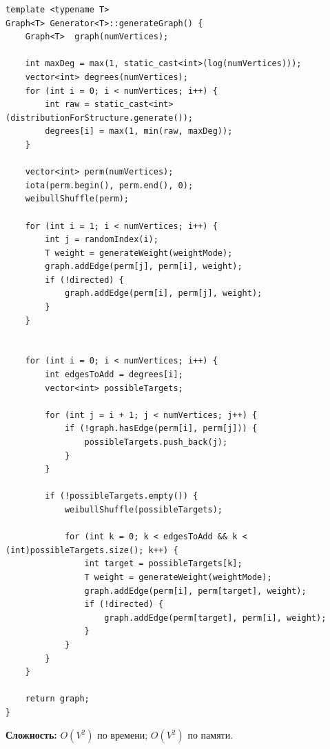 \begin{lstlisting}[style=cstyle, caption={Генерация графа (generator.cpp)}]
template <typename T>
Graph<T> Generator<T>::generateGraph() {
	Graph<T>  graph(numVertices);

	int maxDeg = max(1, static_cast<int>(log(numVertices)));
	vector<int> degrees(numVertices);
	for (int i = 0; i < numVertices; i++) {
		int raw = static_cast<int>(distributionForStructure.generate());
		degrees[i] = max(1, min(raw, maxDeg));
	}

	vector<int> perm(numVertices);
	iota(perm.begin(), perm.end(), 0);
	weibullShuffle(perm);

	for (int i = 1; i < numVertices; i++) {
		int j = randomIndex(i);
		T weight = generateWeight(weightMode);
		graph.addEdge(perm[j], perm[i], weight);
		if (!directed) {
			graph.addEdge(perm[i], perm[j], weight);
		}
	}


	for (int i = 0; i < numVertices; i++) {
		int edgesToAdd = degrees[i];
		vector<int> possibleTargets;

		for (int j = i + 1; j < numVertices; j++) {
			if (!graph.hasEdge(perm[i], perm[j])) {
				possibleTargets.push_back(j);
			}
		}

		if (!possibleTargets.empty()) {
			weibullShuffle(possibleTargets);

			for (int k = 0; k < edgesToAdd && k < (int)possibleTargets.size(); k++) {
				int target = possibleTargets[k];
				T weight = generateWeight(weightMode);
				graph.addEdge(perm[i], perm[target], weight);
				if (!directed) {
					graph.addEdge(perm[target], perm[i], weight);
				}
			}
		}
	}

	return graph;
}
\end{lstlisting}

\textbf{Сложность:} $O(V^2)$ по времени; $O(V^2)$ по памяти.
